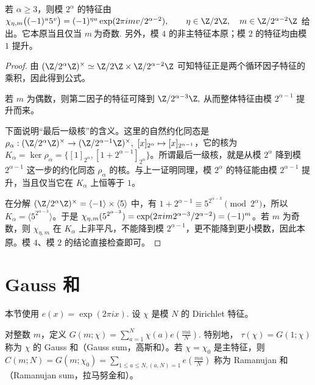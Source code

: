 \begin{theorem}[二的幂模特征的指标组表示]
若 $\alpha\ge3$，则模 $2^\alpha$ 的特征由
\(
  \chi_{\eta,m}\bigl((-1)^u5^v\bigr)
  =
  (-1)^{\eta u}\expi{mv/2^{\alpha-2}},
  \qquad
  \eta\in\Cyc2,\quad m\in\Cyc{2^{\alpha-2}}
\)
给出。它本原当且仅当
\(
  m\ \text{为奇数}.
\)
另外，模 $4$ 的非主特征本原；模 $2$ 的特征均由模 $1$ 提升。
\end{theorem}

\begin{proof}
由
\(
  \U{2^\alpha}\simeq \Cyc2\times \Cyc{2^{\alpha-2}}
\)
可知特征正是两个循环因子特征的乘积，因此得到公式。

若 $m$ 为偶数，则第二因子的特征可降到
\(
  \Cyc{2^{\alpha-3}},
\)
从而整体特征由模 $2^{\alpha-1}$ 提升而来。

下面说明“最后一级核”的含义。这里的自然约化同态是
\(\rho_\alpha:\U{2^\alpha}\to\U{2^{\alpha-1}},\ [x]_{2^\alpha}\mapsto [x]_{2^{\alpha-1}}\)，它的核为
\(K_\alpha=\ker\rho_\alpha=\{[1]_{2^\alpha},[1+2^{\alpha-1}]_{2^\alpha}\}\)。所谓最后一级核，就是从模 \(2^\alpha\) 降到模 \(2^{\alpha-1}\) 这一步的约化同态 \(\rho_\alpha\) 的核。与上一证明同理，模 \(2^\alpha\) 的特征能由模 \(2^{\alpha-1}\) 提升，当且仅当它在 \(K_\alpha\) 上恒等于 \(1\)。

在分解 \(\U{2^\alpha}=\langle -1\rangle\times\langle5\rangle\) 中，有 \(1+2^{\alpha-1}\equiv5^{2^{\alpha-3}}\pmod {2^\alpha}\)，所以 \(K_\alpha=\langle 5^{2^{\alpha-3}}\rangle\)。于是
\(\chi_{\eta,m}(5^{2^{\alpha-3}})=\exp(2\pi i m2^{\alpha-3}/2^{\alpha-2})=(-1)^m\)。若 \(m\) 为奇数，则 \(\chi_{\eta,m}\) 在 \(K_\alpha\) 上非平凡，不能降到模 \(2^{\alpha-1}\)，更不能降到更小模数，因此本原。模 $4$、模 $2$ 的结论直接检查即可。
\end{proof}

\section{Gauss 和}

本节使用
\(
  e(x)=\exp(2\pi i x).
\)
设 $\chi$ 是模 $N$ 的 Dirichlet 特征。

\begin{definition}[Gauss 和]
对整数 $m$，定义
\(
  G(m;\chi)
  =
  \sum_{a=1}^{N}\chi(a)e\!\left(\frac{ma}{N}\right).
\)
特别地，
\(
  \tau(\chi)=G(1;\chi)
  \)
称为 $\chi$ 的 Gauss 和（Gauss sum，高斯和）。若 $\chi=\chi_0$ 是主特征，则
\(
  C(m;N)=G(m;\chi_0)
  =
  \sum_{1\leq a\leq N,\allowbreak{}(a,N)=1}
  e\!\left(\frac{ma}{N}\right)
 \)
称为 Ramanujan 和（Ramanujan sum，拉马努金和）。
\end{definition}

